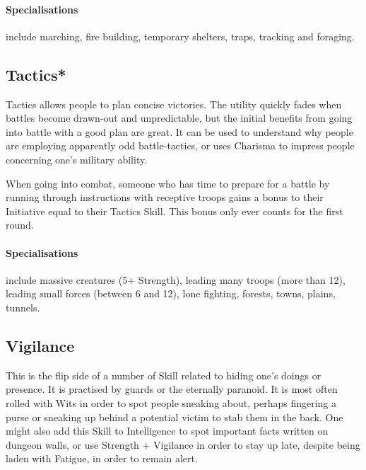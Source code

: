 \begin{multicols}{2}
\paragraph{Specialisations} include marching, fire building, temporary shelters, traps, tracking and foraging.

\subsection{Tactics*}

Tactics allows people to plan concise victories.
The utility quickly fades when battles become drawn-out and unpredictable, but the initial benefits from going into battle with a good plan are great.
It can be used to understand why people are employing apparently odd battle-tactics, or uses Charisma to impress people concerning one's military ability.

When going into combat, someone who has time to prepare for a battle by running through instructions with receptive troops gains a bonus to their Initiative equal to their Tactics Skill. This bonus only ever counts for the first \gls{round}.

\paragraph{Specialisations} include massive creatures (5+ Strength), leading many troops (more than 12), leading small forces (between 6 and 12), lone fighting, forests, towns, plains, tunnels.

\subsection{Vigilance}

This is the flip side of a number of Skill related to hiding one's doings or presence.
It is practised by guards or the eternally paranoid.
It is most often rolled with Wits in order to spot people sneaking about, perhaps fingering a purse or sneaking up behind a potential victim to stab them in the back.
One might also add this Skill to Intelligence to spot important facts written on dungeon walls, or use Strength + Vigilance in order to stay up late, despite being laden with Fatigue, in order to remain alert.

\end{multicols}

